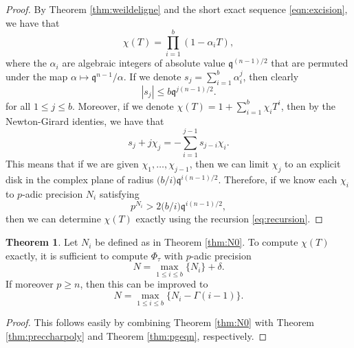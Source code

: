 \documentclass[a4paper,11pt]{article}
\numberwithin{equation}{section}
\theoremstyle{definition}
\newtheorem{thm}{Theorem}[section]
\begin{document}
\begin{proof}
By Theorem \ref{thm:weildeligne} and the short exact sequence \eqref{eqn:excision}, we have that
\[
\chi(T)=\prod_{i=1}^b (1-\alpha_i T),
\]
where the $\alpha_i$ are algebraic integers of absolute value $\mathfrak{q}^{(n-1)/2}$ that are
permuted under the map $\alpha \mapsto \mathfrak{q}^{n-1}/\alpha$. If we denote
$s_j = \sum_{i=1}^{b} \alpha_i^j$, then clearly
\[
|s_j| \leq b \mathfrak{q}^{j (n-1)/2}.
\]
for all $1 \leq j \leq b$. Moreover, if we denote $\chi(T) = 1+\sum_{i=1}^{b} \chi_i T^i$, 
then by the Newton-Girard identies, we have that
\begin{equation} \label{eq:recursion}
s_j+j \chi_j = - \sum_{i=1}^{j-1} s_{j-i} \chi_i.
\end{equation}
This means that if we are given $\chi_1,\ldots,\chi_{j-1}$, then we can limit $\chi_j$ to an explicit 
disk in the complex plane of radius $\bigl( b/i \bigr) \mathfrak{q}^{i (n-1) / 2}$. Therefore, 
if we know each $\chi_i$ to $p$-adic precision $N_i$ satisfying
\[
p^{N_i} > 2 \bigl( b/i \bigr) \mathfrak{q}^{i (n-1) / 2},
\] 
then we can determine $\chi(T)$ exactly using the recursion \eqref{eq:recursion}.
\end{proof}

\begin{thm} \label{thm:precPhitau}
Let $N_i$ be defined as in Theorem \ref{thm:N0}. To compute $\chi(T)$ exactly, it is sufficient to 
compute $\Phi_{\tau}$ with $p$-adic precision
\[
N = \max_{1 \leq i \leq b} \{ N_i \} +\delta.
\]
If moreover $p \geq n$, then this can be improved to
\[
N = \max_{1 \leq i \leq b} \{ N_i -\Gamma(i-1) \}.
\]
\end{thm}

\begin{proof}
This follows easily by combining Theorem \ref{thm:N0} with Theorem \ref{thm:preccharpoly} and 
Theorem \ref{thm:pgeqn}, respectively.
\end{proof}
\end{document}
